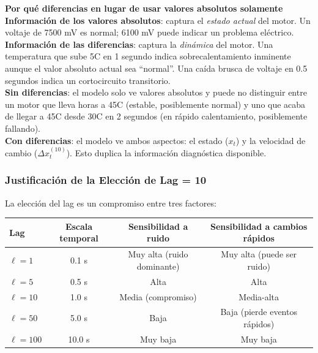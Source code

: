 \documentclass[12pt,a4paper]{article}
\begin{document}
\begin{porquebox}
\textbf{Por qu\'{e} diferencias en lugar de usar valores absolutos solamente}\\[4pt]
\textbf{Informaci\'{o}n de los valores absolutos}: captura el \textit{estado actual}
del motor. Un voltaje de 7500 mV es normal; 6100 mV puede indicar un problema el\'{e}ctrico.\\[4pt]
\textbf{Informaci\'{o}n de las diferencias}: captura la \textit{din\'{a}mica} del motor.
Una temperatura que sube 5\textdegree{}C en 1 segundo indica sobrecalentamiento
inminente aunque el valor absoluto actual sea ``normal''. Una ca\'{i}da brusca de
voltaje en 0.5 segundos indica un cortocircuito transitorio.\\[4pt]
\textbf{Sin diferencias}: el modelo solo ve valores absolutos y puede no distinguir
entre un motor que lleva horas a 45\textdegree{}C (estable, posiblemente normal) y
uno que acaba de llegar a 45\textdegree{}C desde 30\textdegree{}C en 2 segundos
(en r\'{a}pido calentamiento, posiblemente fallando).\\[4pt]
\textbf{Con diferencias}: el modelo ve ambos aspectos: el estado ($x_t$) y la
velocidad de cambio ($\Delta x_t^{(10)}$). Esto duplica la informaci\'{o}n
diagn\'{o}stica disponible.
\end{porquebox}

\subsubsection{Justificaci\'{o}n de la Elecci\'{o}n de Lag = 10}

La elecci\'{o}n del lag es un compromiso entre tres factores:

\begin{center}
\begin{tabular}{lccc}
\toprule
\textbf{Lag} & \textbf{Escala temporal} & \textbf{Sensibilidad a ruido} & \textbf{Sensibilidad a cambios r\'{a}pidos} \\
\midrule
$\ell = 1$  & 0.1 s & Muy alta (ruido dominante) & Muy alta (puede ser ruido) \\
$\ell = 5$  & 0.5 s & Alta & Alta \\
$\ell = 10$ & 1.0 s & Media (compromiso) & Media-alta \\
$\ell = 50$ & 5.0 s & Baja & Baja (pierde eventos r\'{a}pidos) \\
$\ell = 100$& 10.0 s & Muy baja & Muy baja \\
\bottomrule
\end{tabular}
\end{center}
\end{document}
